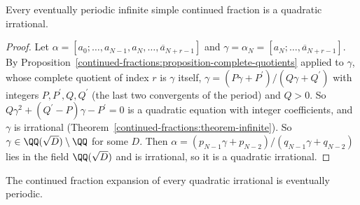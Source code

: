 \begin{theorem}[Euler]\label{continued-fractions:theorem-euler-periodic}
Every eventually periodic infinite simple continued fraction is a quadratic irrational.
\end{theorem}

\begin{proof}
Let $\alpha = [a_0; \ldots, a_{N-1}, \overline{a_N, \ldots, a_{N+r-1}}]$ and $\gamma = \alpha_N = [\overline{a_N; \ldots, a_{N+r-1}}]$. By Proposition~\ref{continued-fractions:proposition-complete-quotients}
applied to $\gamma$, whose complete quotient of index $r$ is $\gamma$ itself, $\gamma = (P\gamma + P^{\prime})/(Q\gamma + Q^{\prime})$ with integers $P, P^{\prime}, Q, Q^{\prime}$ (the last two convergents of
the period) and $Q > 0$. So $Q\gamma^2 + (Q^{\prime} - P)\gamma - P^{\prime} = 0$ is a quadratic equation with integer coefficients, and $\gamma$ is irrational (Theorem~\ref{continued-fractions:theorem-infinite}).
So $\gamma \in \QQ(\sqrt D) \setminus \QQ$ for some $D$. Then $\alpha = (p_{N-1}\gamma + p_{N-2})/(q_{N-1}\gamma + q_{N-2})$ lies in the field $\QQ(\sqrt D)$ and is irrational, so it is a quadratic
irrational.
\end{proof}

\begin{theorem}[Lagrange]\label{continued-fractions:theorem-lagrange-periodic}
The continued fraction expansion of every quadratic irrational is eventually periodic.
\end{theorem}

